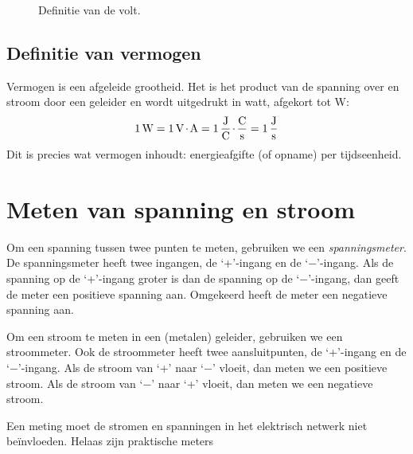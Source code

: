 \begin{figure}[!ht]
\centering
{}
\caption{Definitie van de volt.}
\label{fig:intdefinitievolt}
\end{figure}

\subsection{Definitie van vermogen}
Vermogen is een afgeleide grootheid. Het is het product van de spanning over en stroom door een geleider en wordt uitgedrukt in watt, afgekort tot \si{\watt}:
%
\begin{equation}
\SI{1}{\watt} = \SI{1}{\volt}\cdot\si{\ampere} = \SI[per-mode=fraction]{1}{\joule\per\coulomb}\cdot\si[per-mode=fraction]{\coulomb\per\second} = \SI[per-mode=fraction]{1}{\joule\per\second}
\end{equation}
%
Dit is precies wat vermogen inhoudt: energieafgifte (of opname) per tijdseenheid.

\section{Meten van spanning en stroom}
Om een spanning tussen twee punten te meten, gebruiken we een \textsl{spanningsmeter}. De spanningsmeter heeft twee ingangen, de `+'-ingang en de `$-$'-ingang. Als de spanning op de `+'-ingang groter is dan de spanning op de `$-$'-ingang, dan geeft de meter een positieve spanning aan. Omgekeerd heeft de meter een negatieve spanning aan.

Om een stroom te meten in een (metalen) geleider, gebruiken we een stroommeter. Ook de stroommeter heeft twee aansluitpunten, de `+'-ingang en de `$-$'-ingang. Als de stroom van `+' naar `$-$' vloeit, dan meten we een positieve stroom. Als de stroom van `$-$' naar `+' vloeit, dan meten we een negatieve stroom.

Een meting moet de stromen en spanningen in het elektrisch netwerk niet beïnvloeden. Helaas zijn praktische meters

